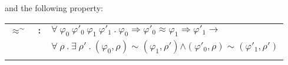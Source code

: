 \documentclass[conference]{IEEEtran}
\newenvironment{todo}{\medskip\hrule\smallskip\noindent}{\smallskip\hrule\medskip}
\renewcommand{\aa}[1]{\begin{todo}\textcolor{OliveGreen}{Andrei:}\\ \color{OliveGreen}{#1}\color{black}\end{todo}}
\renewcommand{\aa}[1]{}
\newcommand{\Ra}{\Rightarrow}
\renewcommand{\implies}{\rightarrow}
\newcommand{\rrule}[2]{{#1} \Ra{#2}}
\newcommand{\coqtt}[1]{{\small \texttt{#1}}}
\newcommand{\cand}{\pmb{\land}}
\newcommand{\cforall}{\pmb{\forall}}
\begin{document}
\noindent
and the following property:\\[1ex]

\noindent
\begin{minipage}{\textwidth}
\begin{tabular}{lcl}
$\approx^\sim$ & \coqtt{:} & $\cforall~\varphi_0~\varphi'_0~\varphi_1~\varphi'_1~.~\rrule{\varphi_0}{\varphi'_0} \approx \rrule{\varphi_1}{\varphi'_1} \implies$\\
&& \hspace*{2ex}$\cforall~\rho~.~\exists~\rho'~.~(\varphi_0, \rho) \sim (\varphi_1, \rho') \cand (\varphi'_0, \rho) \sim (\varphi'_1, \rho')$\\\\
\end{tabular}
\end{minipage}

\end{document}
